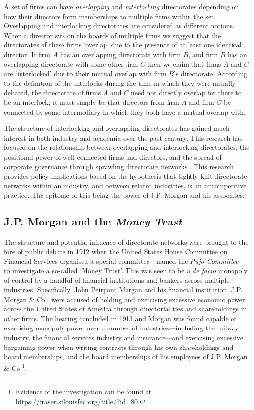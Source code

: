 \documentclass[11pt,fleqn]{article}
\begin{document}
A set of firms can have \emph{overlapping} and \emph{interlocking} directorates depending on how their directors form memberships to multiple firms within the set. Overlapping and interlocking directorates are considered as different notions. When a director sits on the boards of multiple firms we suggest that the directorates of these firms `overlap' due to the presence of at least one identical director. If firm $A$ has an overlapping directorate with firm $B$, and firm $B$ has an overlapping directorate with some other firm $C$ then we claim that firms $A$ and $C$ are `interlocked' due to their mutual overlap with firm $B$'s directorate. According to the definition of the interlocks during the time in which they were initially debated, the directorate of firms $A$ and $C$ need not directly overlap for there to be an interlock; it must simply be that directors from firm $A$ and firm $C$ be connected by some intermediary in which they both have a mutual overlap with. 

The structure of interlocking and overlapping directorates has gained much interest in both industry and academia over the past century. This research has focused on the relationship between overlapping and interlocking directorates, the positional power of well-connected firms and directors, and the spread of corporate governance through sprawling directorate networks \citep{RoyBonacich1988}. This research provides policy implications based on the hypothesis that tightly-knit directorate networks within an industry, and between related industries, is an uncompetitive practice. The epitome of this being the power of J.P. Morgan and his associates.

\subsection{J.P. Morgan and the \emph{Money Trust}}

The structure and potential influence of directorate networks were brought to the fore of public debate in 1912 when the United States House Committee on Financial Services organised a special committee---named the \emph{Pujo Committee}---to investigate a so-called `Money Trust'. This was seen to be a \emph{de facto} monopoly of control by a handful of financial institutions and bankers across multiple industries. Specifically, John Peirpont Morgan and his financial institution, J.P. Morgan \& Co., were accused of holding and exercising excessive economic power across the United States of America through directorial ties and shareholdings in other firms. The hearing concluded in 1913 and Morgan was found capable of exercising monopoly power over a number of industries---including the railway industry, the financial services industry and insurance---and exercising excessive bargaining power when writing contracts through his own shareholdings and board memberships, and the board memberships of his employees of J.P. Morgan \& Co \footnote{Evidence of the investigation can be found at \href{https://fraser.stlouisfed.org/title/?id=80}{https://fraser.stlouisfed.org/title/?id=80}.}.
\end{document}

